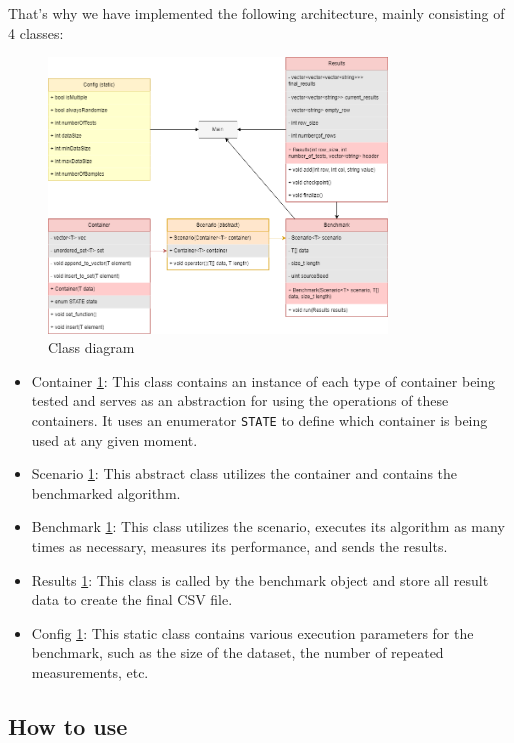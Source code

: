 \documentclass[conference]{IEEEtran} \IEEEoverridecommandlockouts \usepackage{graphicx}
\def\code#1{\texttt{#1}}
\begin{document}
That's why we have implemented the following architecture, mainly consisting of 4 classes:

\begin{figure}[!h]
	\includegraphics[width=9cm]{Diagram/architecture.png}
	\caption{Class diagram}
	\label{class diagram}
\end{figure}

\begin{itemize}
	\item Container \ref{class diagram}: This class contains an instance of each type
          of container being tested and serves as an abstraction for using the operations
          of these containers. It uses an enumerator \code{STATE} to define which
          container is being used at any given moment.
	\item Scenario \ref{class diagram}: This abstract class utilizes the container and
          contains the benchmarked algorithm.
	\item Benchmark \ref{class diagram}: This class utilizes the scenario, executes
          its algorithm as many times as necessary, measures its performance, and sends
          the results.
	\item Results \ref{class diagram}: This class is called by the benchmark object
          and store all result data to create the final CSV file.
	\item Config \ref{class diagram}: This static class contains various execution
          parameters for the benchmark, such as the size of the dataset, the number of
          repeated measurements, etc.
\end{itemize}

\subsection{How to use}
\end{document}
